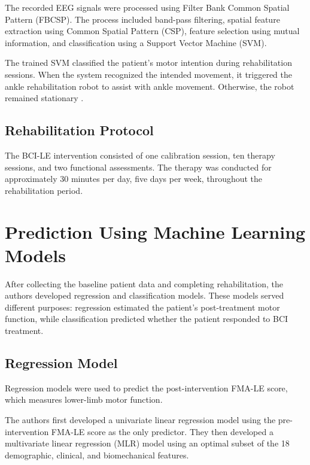 The recorded EEG signals were processed using Filter Bank Common Spatial Pattern (FBCSP). The process included band-pass filtering, spatial feature extraction using Common Spatial Pattern (CSP), feature selection using mutual information, and classification using a Support Vector Machine (SVM).

The trained SVM classified the patient's motor intention during rehabilitation sessions. When the system recognized the intended movement, it triggered the ankle rehabilitation robot to assist with ankle movement. Otherwise, the robot remained stationary \cite{bib1}.

\subsection{{Rehabilitation Protocol}}

The BCI-LE intervention consisted of one calibration session, ten therapy sessions, and two functional assessments. The therapy was conducted for approximately 30 minutes per day, five days per week, throughout the rehabilitation period.


\section{{Prediction Using Machine Learning Models}}

After collecting the baseline patient data and completing rehabilitation, the authors developed regression and classification models. These models served different purposes: regression estimated the patient's post-treatment motor function, while classification predicted whether the patient responded to BCI treatment.

\subsection{Regression Model}

Regression models were used to predict the post-intervention FMA-LE score, which measures lower-limb motor function.

The authors first developed a univariate linear regression model using the pre-intervention FMA-LE score as the only predictor. They then developed a multivariate linear regression (MLR) model using an optimal subset of the 18 demographic, clinical, and biomechanical features.

